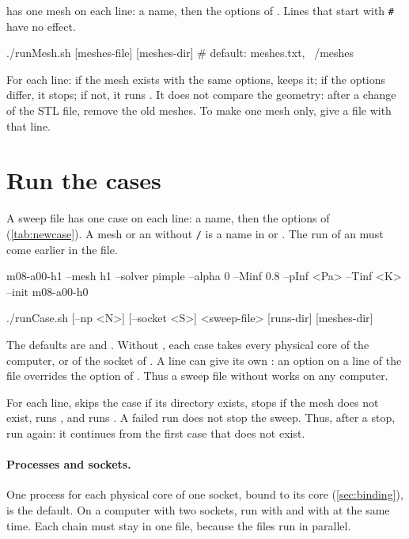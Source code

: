  has one mesh on each line: a name, then the options of
. Lines that start with \texttt{\#} have no effect.

\begin{shell}
./runMesh.sh [meshes-file] [meshes-dir]      # default: meshes.txt, ~/meshes
\end{shell}

For each line: if the mesh exists with the same options,  keeps it; if
the options differ, it stops; if not, it runs . It does not compare the
geometry: after a change of the STL file, remove the old meshes. To make one mesh only,
give a file with that line.

\section{Run the cases}\label{sec:run-sweep}

A sweep file has one case on each line: a name, then the options of 
(\cref{tab:newcase}). A mesh or an  without \texttt{/} is a name in
 or . The run of an  must come earlier
in the file.

\begin{shell}
m08-a00-h1  --mesh h1 --solver pimple --alpha 0 --Minf 0.8 --pInf <Pa> --Tinf <K> --init m08-a00-h0
\end{shell}

\begin{shell}
./runCase.sh [--np <N>] [--socket <S>] <sweep-file> [runs-dir] [meshes-dir]
\end{shell}

The defaults are  and . Without , each case takes
every physical core of the computer, or of the socket of . A line can
give its own : an option on a line of the file overrides the option of
. Thus a sweep file without  works on any computer.

For each line,  skips the case if its directory exists, stops if the
mesh does not exist, runs , and runs . A failed run does
not stop the sweep. Thus, after a stop, run  again: it continues from
the first case that does not exist.

\paragraph{Processes and sockets.} One process for each physical core of one socket,
bound to its core (\cref{sec:binding}), is the default. On a computer with two sockets,
run  with  and  with
 at the same time. Each chain must stay in one file, because the files
run in parallel.


